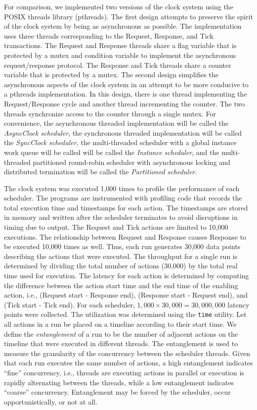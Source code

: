 For comparison, we implemented two versions of the clock system using the POSIX threads library (pthreads).
The first design attempts to preserve the spirit of the clock system by being as asynchronous as possible.
The implementation uses three threads corresponding to the Request, Response, and Tick transactions.
The Request and Response threads share a flag variable that is protected by a mutex and condition variable to implement the asynchronous request/response protocol.
The Response and Tick threads share a counter variable that is protected by a mutex.
The second design simplifies the asynchronous aspects of the clock system in an attempt to be more conducive to a pthreads implementation.
In this design, there is one thread implementing the Request/Response cycle and another thread incrementing the counter.
The two threads synchronize access to the counter through a single mutex.
For convenience, the asynchronous threaded implementation will be called the \emph{AsyncClock scheduler}, the synchronous threaded implementation will be called the \emph{SyncClock scheduler}, the multi-threaded scheduler with a global instance work queue will be called will be called the \emph{Instance scheduler}, and the multi-threaded partitioned  round-robin scheduler with asynchronous locking and distributed termination will be called the \emph{Partitioned scheduler}.

The clock system was executed 1,000 times to profile the performance of each scheduler.
The programs are instrumented with profiling code that records the total execution time and timestamps for each action.
The timestamps are stored in memory and written after the scheduler terminates to avoid disruptions in timing due to output.
The Request and Tick actions are limited to 10,000 executions.
The relationship between Request and Response causes Response to be executed 10,000 times as well.
Thus, each run generates 30,000 data points describing the actions that were executed.
The throughput for a single run is determined by dividing the total number of actions (30,000) by the total real time used for execution.
The latency for each action is determined by computing the difference between the action start time and the end time of the enabling action, i.e., (Request start - Response end), (Response start - Request end), and (Tick start - Tick end).
For each scheduler, $1,000 \times 30,000 = 30,000,000$ latency points were collected.
The utilization was determined using the \verb+time+ utility.
Let all actions in a run be placed on a timeline according to their start time.
We define the \emph{entanglement} of a run to be the number of adjacent actions on the timeline that were executed in different threads.
The entanglement is used to measure the granularity of the concurrency between the scheduler threads.
Given that each run executes the same number of actions, a high entanglement indicates ``fine'' concurrency, i.e., threads are executing actions in parallel or execution is rapidly alternating between the threads, while a low entanglement indicates ``coarse'' concurrency.
Entanglement may be forced by the scheduler, occur opportunistically, or not at all.

